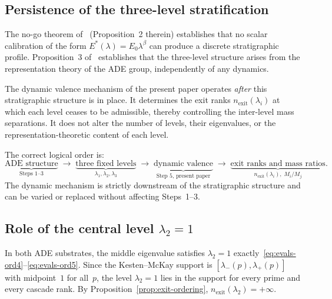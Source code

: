 \documentclass[11pt,a4paper]{article}
\newcommand{\nexit}{n_{\mathrm{exit}}}
\begin{document}
    \subsection{Persistence of the three-level stratification}
      \label{subsec:three-level}

      The no-go theorem of~\cite{Beau2026a4} (Proposition~2 therein)
      establishes that no scalar calibration of the form $E^{*}(\lambda) = E_0\lambda^\beta$
      can produce a discrete stratigraphic profile.
      Proposition~3 of~\cite{Beau2026a4} establishes that the three-level
      structure arises from the representation theory of the ADE group,
      independently of any dynamics.

      The dynamic valence mechanism of the present paper operates \emph{after}
      this stratigraphic structure is in place.
      It determines the exit ranks $\nexit(\lambda_i)$ at which each level
      ceases to be admissible, thereby controlling the inter-level mass separations.
      It does not alter the number of levels, their eigenvalues, or
      the representation-theoretic content of each level.

      The correct logical order is:
      \begin{equation*}
        \underbrace{\text{ADE structure}}_{\text{Steps 1--3}}
        \;\longrightarrow\;
        \underbrace{\text{three fixed levels}}_{\lambda_1,\lambda_2,\lambda_3}
        \;\longrightarrow\;
        \underbrace{\text{dynamic valence}}_{\text{Step 5, present paper}}
        \;\longrightarrow\;
        \underbrace{\text{exit ranks and mass ratios}}_{\nexit(\lambda_i),\; M_i/M_j}.
      \end{equation*}
      The dynamic mechanism is strictly downstream of the stratigraphic structure
      and can be varied or replaced without affecting Steps~1--3.

    \subsection{Role of the central level $\lambda_2 = 1$}
      \label{subsec:lambda2}

      In both ADE substrates, the middle eigenvalue satisfies $\lambda_2 = 1$
      exactly~\eqref{eq:evals-ord4}--\eqref{eq:evals-ord5}.
      Since the Kesten--McKay support is $[\lambda_{-}(p), \lambda_{+}(p)]$
      with midpoint~$1$ for all~$p$, the level $\lambda_2 = 1$ lies in the support
      for every prime and every cascade rank.
      By Proposition~\ref{prop:exit-ordering}, $\nexit(\lambda_2) = +\infty$.
\end{document}
